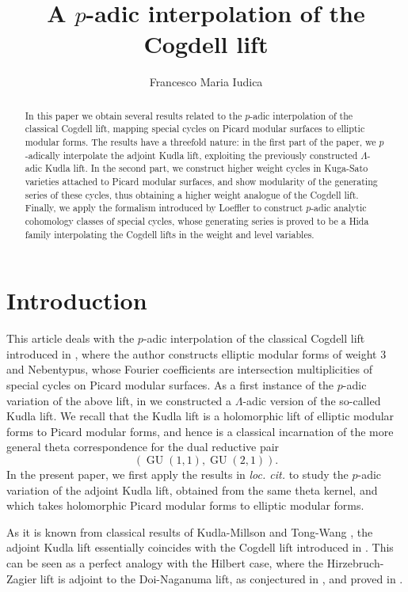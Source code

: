 \documentclass[12pt,a4paper,reqno]{amsart}
\title[A $p$-adic interpolation of the Cogdell lift]{A $p$-adic interpolation of the Cogdell lift}
\author{Francesco Maria Iudica}
\date{}
\theoremstyle{definition}
\numberwithin{definition}{subsection}
\theoremstyle{definition}
\numberwithin{Definition}{subsection}
\theoremstyle{remark}
\theoremstyle{remark}
\numberwithin{Remark}{subsection}
\theoremstyle{remark}
\theoremstyle{plain}
\numberwithin{Theorem}{subsection}
\theoremstyle{plain}
\theoremstyle{plain}
\theoremstyle{plain}
\theoremstyle{plain}
\theoremstyle{plain}
\theoremstyle{plain}
\theoremstyle{plain}
\DeclareMathOperator{\GU}{GU}
\begin{document}
\maketitle

\begin{abstract}
\noindent In this paper we obtain several results related to the $p$-adic interpolation of the classical Cogdell lift, mapping special cycles on Picard modular surfaces to elliptic modular forms. The results have a threefold nature: in the first part of the paper, we $p$-adically interpolate the adjoint Kudla lift, exploiting the previously constructed $\Lambda$-adic Kudla lift. In the second part, we construct higher weight cycles in Kuga-Sato varieties attached to Picard modular surfaces, and show modularity of the generating series of these cycles, thus obtaining a higher weight analogue of the Cogdell lift. Finally, we apply the formalism introduced by Loeffler to construct $p$-adic analytic cohomology classes of special cycles, whose generating series is proved to be a Hida family interpolating the Cogdell lifts in the weight and level variables.
\end{abstract}
{\let\clearpage\relax \tableofcontents} 
\thispagestyle{empty}

\setcounter{section}{-1}
\section{Introduction}
This article deals with the $p$-adic interpolation of the classical Cogdell lift introduced in \cite{cogdell}, where the author constructs elliptic modular forms of weight $3$ and Nebentypus, whose Fourier coefficients are intersection multiplicities of special cycles on Picard modular surfaces. As a first instance of the $p$-adic variation of the above lift, in \cite{iudica} we constructed a $\Lambda$-adic version of the so-called Kudla lift. We recall that the Kudla lift is a holomorphic lift of elliptic modular forms to Picard modular forms, and hence is a classical incarnation of the more general theta correspondence for the dual reductive pair
\[
(\GU(1,1),\GU(2,1)).
\]
In the present paper, we first apply the results in \textit{loc. cit.} to study the $p$-adic variation of the adjoint Kudla lift, obtained from the same theta kernel, and which takes holomorphic Picard modular forms to elliptic modular forms.

As it is known from classical results of Kudla-Millson \cite{km} and Tong-Wang \cite{tongwang}, the adjoint Kudla lift essentially coincides with the Cogdell lift introduced in \cite{cogdell}. This can be seen as a perfect analogy with the Hilbert case, where the Hirzebruch-Zagier lift is adjoint to the Doi-Naganuma lift, as conjectured in \cite[p. 109]{hirzebruch}, and proved in \cite[p. 164]{zagier}. 
\end{document}
